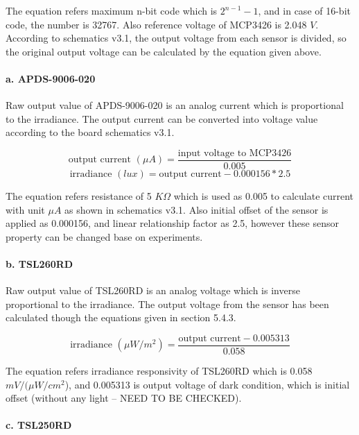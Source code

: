 \bigbreak
The equation refers maximum n-bit code which is \( 2^{n - 1} - 1 \), and in case of 16-bit code, the number is 32767. Also reference voltage of MCP3426 is 2.048 \(V\). According to schematics v3.1, the output voltage from each sensor is divided, so the original output voltage can be calculated by the equation given above.

\paragraph{a. APDS-9006-020}

Raw output value of APDS-9006-020 is an analog current which is proportional to the irradiance. The output current can be converted into voltage value according to the board schematics v3.1.

{\centering
 \[ \text{output current }(\mu A) = \frac{\text{input voltage to MCP3426}}{0.005} \] 
 \[ \text{irradiance } (lux) = {\text{output current} - 0.000156} * 2.5 \]
 \par
 }
 
\bigbreak
The equation refers resistance of 5 \(K \Omega \) which is used as 0.005 to calculate current with unit \(\mu A\) as shown in schematics v3.1. Also initial offset of the sensor is applied as 0.000156, and linear relationship factor as 2.5, however these sensor property can be changed base on experiments.
 
\paragraph{b. TSL260RD}

Raw output value of TSL260RD is an analog voltage which is inverse proportional to the irradiance. The output voltage from the sensor has been calculated though the equations given in section 5.4.3.

{\centering
 \[ \text{irradiance } (\mu W/m^2) = \frac{\text{output current} - 0.005313}{0.058} \]
 \par
 }
 
 \bigbreak
 The equation refers irradiance responsivity of TSL260RD which is 0.058 \(mV/(\mu W/cm^2\)), and 0.005313 is output voltage of dark condition, which is initial offset (without any light -- NEED TO BE CHECKED).
 

\paragraph{c. TSL250RD}


